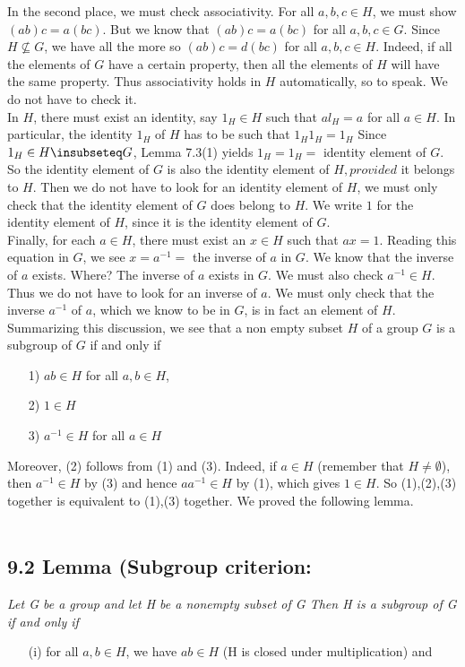\documentclass[11 pt]{amsbook}
\begin{document}

\noindent In the second place, we must check associativity. For all $a,b,c \in H$, we must show $(ab)c = a(bc)$. But we know that $(ab)c = a(bc)$ for all $a,b,c \in G$. Since $H \nsubseteq G$, we have all the more so $(ab)c = d(bc)$ for all $a,b,c \in H$. Indeed, if all the elements of $G$ have a certain property, then all the elements of $H$ will have the same property. Thus associativity holds in $H$ automatically, so to speak. We do not have to check it. \\

\noindent In $H$, there must exist an identity, say $1_H \in H$ such that $al_H = a$ for all $a \in H$. In particular, the identity $1_H$ of $H$ has to be such that $1_H 1_H = 1_H$ Since $1_H \in H \insubseteq G$, Lemma 7.3(1) yields $1_H = 1_H =$ identity element of $G$. So the identity element of $G$ is also the identity element of $H, provided$ it belongs to $H$. Then we do not have to look for an identity element of $H$, we must only check that the identity element of $G$ does belong to $H$. We write $1$ for the identity element of $H$, since it is the identity element of $G$. \\

\noindent Finally, for each $a \in H$, there must exist an $x \in H$ such that $ax = 1$. Reading this equation in $G$, we see $x = a^{-1} =$ the inverse of $a$ in $G$. We know that the inverse of $a$ exists. Where? The inverse of $a$ exists in $G$. We must also check $a^{-1} \in H$. Thus we do not have to look for an inverse of $a$. We must only check that the inverse $a^{-1}$ of $a$, which we know to be in $G$, is in fact an element of $H$. \\

\noindent Summarizing this discussion, we see that a non empty subset $H$ of a group $G$ is a subgroup of $G$ if and only if
\begin{itemize}
    \item [1)] $ab \in H$ for all $a,b \in H$,
    \item [2)] $1 \in H$
    \item [3)] $a^{-1} \in H$ for all $a \in H$
\end{itemize}

\noindent Moreover, (2) follows from (1) and (3). Indeed, if $a \in H$ (remember that $H \neq \emptyset$), then $a^{-1} \in H$ by (3) and hence $aa^{-1} \in H$ by (1), which gives $1 \in H$. So (1),(2),(3) together is equivalent to (1),(3) together. We proved the following lemma. \\ \\

\subsection*{9.2 Lemma (Subgroup criterion: \) } \textit{Let G be a group and let H be a nonempty subset of G Then H is a subgroup of G if and only if}
\begin{itemize}
    \item[(i)] for all $a,b \in H$, we have $ab \in H$ (H is closed under multiplication) and
\end{itemize}
\end{document}
